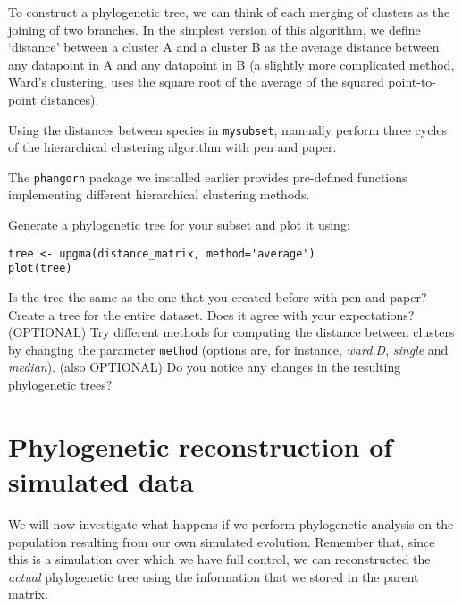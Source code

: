 \documentclass[a4paper, 9pt]{article}
\begin{document}
To construct a phylogenetic tree, we can think of each merging of
clusters as the joining of two branches. In the simplest version of this
algorithm, we define `distance' between a cluster A and a cluster B as
the average distance between any datapoint in A and any datapoint in B
(a slightly more complicated method, Ward's clustering, uses the square
root of the average of the squared point-to-point distances).

\begin{exercise}
    \askstar Using the distances between species in \texttt{mysubset}, manually perform three cycles of the hierarchical clustering algorithm with pen and paper.
\end{exercise}

The \texttt{phangorn} package we installed earlier provides pre-defined
functions implementing different hierarchical clustering methods.

\begin{exercise}
    \action Generate a phylogenetic tree for your subset and plot it using:\begin{lstlisting}
tree <- upgma(distance_matrix, method='average')
plot(tree)\end{lstlisting}
Is the tree the same as the one that you created before with pen and paper?
\action Create a tree for the entire dataset. Does it agree with your expectations?
\action (OPTIONAL) Try different methods for computing the distance between clusters by changing the parameter \texttt{method} (options are, for instance, \textit{ward.D}, \textit{single} and \textit{median}). \ask (also OPTIONAL) Do you notice any changes in the resulting phylogenetic trees?
\end{exercise}

\section{Phylogenetic reconstruction of simulated
data}\label{phylogenetic-reconstruction-of-simulated-data}

We will now investigate what happens if we perform phylogenetic analysis
on the population resulting from our own simulated evolution. Remember
that, since this is a simulation over which we have full control, we can
reconstructed the \emph{actual} phylogenetic tree using the information
that we stored in the parent matrix.
\end{document}
